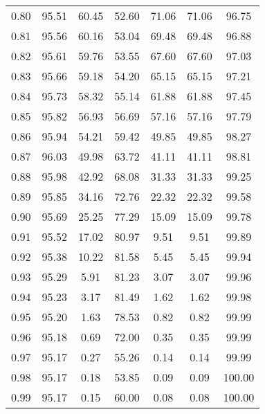 \begin{tabular}{|c|c|c|c|c|c|c|}
      0.80 &     95.51 &     60.45 &      52.60 &   71.06 &      71.06 &         96.75 \\
      0.81 &     95.56 &     60.16 &      53.04 &   69.48 &      69.48 &         96.88 \\
      0.82 &     95.61 &     59.76 &      53.55 &   67.60 &      67.60 &         97.03 \\
      0.83 &     95.66 &     59.18 &      54.20 &   65.15 &      65.15 &         97.21 \\
      0.84 &     95.73 &     58.32 &      55.14 &   61.88 &      61.88 &         97.45 \\
      0.85 &     95.82 &     56.93 &      56.69 &   57.16 &      57.16 &         97.79 \\
      0.86 &     95.94 &     54.21 &      59.42 &   49.85 &      49.85 &         98.27 \\
      0.87 &     96.03 &     49.98 &      63.72 &   41.11 &      41.11 &         98.81 \\
      0.88 &     95.98 &     42.92 &      68.08 &   31.33 &      31.33 &         99.25 \\
      0.89 &     95.85 &     34.16 &      72.76 &   22.32 &      22.32 &         99.58 \\
      0.90 &     95.69 &     25.25 &      77.29 &   15.09 &      15.09 &         99.78 \\
      0.91 &     95.52 &     17.02 &      80.97 &    9.51 &       9.51 &         99.89 \\
      0.92 &     95.38 &     10.22 &      81.58 &    5.45 &       5.45 &         99.94 \\
      0.93 &     95.29 &      5.91 &      81.23 &    3.07 &       3.07 &         99.96 \\
      0.94 &     95.23 &      3.17 &      81.49 &    1.62 &       1.62 &         99.98 \\
      0.95 &     95.20 &      1.63 &      78.53 &    0.82 &       0.82 &         99.99 \\
      0.96 &     95.18 &      0.69 &      72.00 &    0.35 &       0.35 &         99.99 \\
      0.97 &     95.17 &      0.27 &      55.26 &    0.14 &       0.14 &         99.99 \\
      0.98 &     95.17 &      0.18 &      53.85 &    0.09 &       0.09 &        100.00 \\
      0.99 &     95.17 &      0.15 &      60.00 &    0.08 &       0.08 &        100.00 \\
\bottomrule
\end{tabular}
